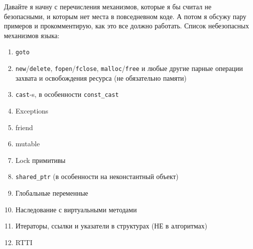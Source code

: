 Давайте я начну с перечисления механизмов, которые я бы считал не безопасными, и которым нет места в повседневном коде.
А потом я обсужу пару примеров и прокомментирую, как это все должно работать.
Список небезопасных механизмов языка:
\begin{enumerate}
\item \verb"goto"

\item \verb"new"/\verb"delete", \verb"fopen"/\verb"fclose", \verb"malloc"/\verb"free" и любые другие парные операции захвата и освобождения ресурса (не обязательно памяти)

\item \verb"cast"-s, в особенности \verb"const_cast"

\item Exceptions

\item friend

\item mutable

\item Lock примитивы

\item \verb"shared_ptr" (в особенности на неконстантный объект)

\item Глобальные переменные

\item Наследование с виртуальными методами

\item Итераторы, ссылки и указатели в структурах (НЕ в алгоритмах)

\item RTTI
\end{enumerate}




